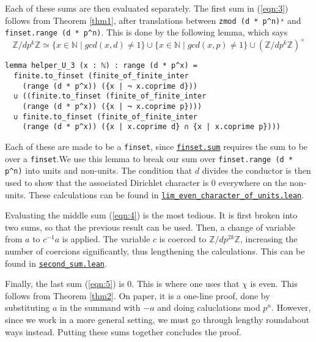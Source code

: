 \documentclass[a4paper,UKenglish,cleveref, autoref, thm-restate]{lipics-v2021}
\newcommand{\lean}[1]{\texttt{#1}\xspace} %
\begin{document}
Each of these sums are then evaluated separately. The first sum in (\ref{eqn:3}) follows from Theorem \ref{thm1}, after translations between \lean{zmod (d * p\textasciicircum n)ˣ} and \lean{finset.range (d * p\textasciicircum n)}. 
This is done by the following lemma, which says 
$$ \mathbb{Z} / d p^k \mathbb{Z} \simeq \{ x \in \mathbb{N} \mid gcd (x, d) \ne 1 \} \cup \{ x \in \mathbb{N} \mid gcd (x, p) \ne 1 \} 
\cup (\mathbb{Z} / d p^k \mathbb{Z})^{\times} $$ 
\begin{lstlisting}
lemma helper_U_3 (x : ℕ) : range (d * p^x) = 
  finite.to_finset (finite_of_finite_inter 
    (range (d * p^x)) ({x | ¬ x.coprime d})) 
  ∪ ((finite.to_finset (finite_of_finite_inter 
    (range (d * p^x)) ({x | ¬ x.coprime p}))) 
  ∪ finite.to_finset (finite_of_finite_inter 
    (range (d * p^x)) ({x | x.coprime d} ∩ {x | x.coprime p}))) 
\end{lstlisting}
Each of these are made to be a \lean{finset}, since \href{https://leanprover-community.github.io/mathlib_docs/algebra/big_operators/basic.html#finset.sum}{\lean{finset.sum}} 
requires the sum to be over a \lean{finset}.We use this lemma to break our sum over \lean{finset.range (d * p\textasciicircum n)} into units and non-units. 
The condition that $d$ divides the conductor is then used to show that the associated Dirichlet character is 0 everywhere on the non-units. 
These calculations can be found in \href{https://github.com/laughinggas/p-adic-L-functions/blob/main/src/general_bernoulli_number/lim_even_character_of_units.lean}{\lean{lim\_even\_character\_of\_units.lean}}.

Evaluating the middle sum (\ref{eqn:4}) is the most tedious. It is first broken into two sums, so that the previous result can be used. Then, a 
change of variable from $a$ to $c^{-1} a$ is applied. The variable $c$ is coerced to $\mathbb{Z}/ d p^{2k} \mathbb{Z}$, increasing 
the number of coercions significantly, thus lengthening the calculations. This can be found in \href{https://github.com/laughinggas/p-adic-L-functions/blob/main/src/sum_eval/second_sum.lean}{\lean{second\_sum.lean}}.

Finally, the last sum (\ref{eqn:5}) is 0. This is where one uses that $\chi$ is even. This follows from Theorem \ref{thm2}. 
On paper, it is a one-line proof, done by substituting $a$ in the summand with $-a$ and doing caluclations mod $p^n$. However, since we work in a more general setting, 
we must go through lengthy roundabout ways instead. 
\newline Putting these sums together concludes the proof.
\end{document}
